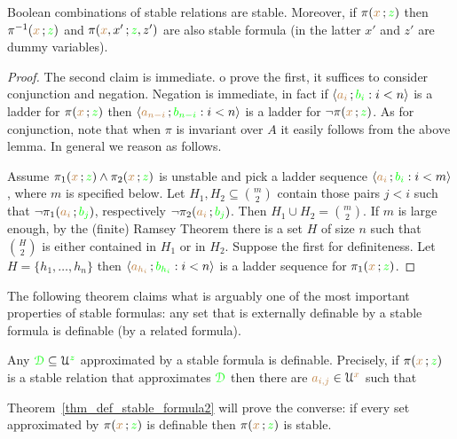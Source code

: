 \begin{lemma}\label{lem_stab_Boole}
  Boolean combinations of stable relations are stable.
  Moreover, if $\pi({\color{brown} x}\,;{\color{green} z})$ then  $\pi^{-1}({\color{brown} x}\,;{\color{green} z})$ and $\pi({\color{brown} x},x'\,;{\color{green} z},z')$ are also stable formula (in the latter $x'$ and $z'$ are dummy variables).
\end{lemma}

\begin{proof}
  The second claim is immediate.
  o prove the first, it suffices to consider conjunction and negation.
  Negation is immediate, in fact if $\langle{\color{brown}a_i}\,;{\color{green} b_i} : i<n\rangle$ is a ladder for $\pi({\color{brown} x}\,;{\color{green} z})$ then $\langle{\color{brown}a_{n-i}}\,;{\color{green} b_{n-i}} : i<n\rangle$ is a ladder for $\neg\pi({\color{brown} x}\,;{\color{green} z})$.
  As for conjunction, note that when $\pi$ is invariant over $A$ it easily follows from the above lemma.
  In general we reason as follows.

  Assume $\pi_1({\color{brown} x}\,;{\color{green} z})\wedge\pi_2({\color{brown} x}\,;{\color{green} z})$ is unstable and pick a ladder sequence $\langle{\color{brown}a_i}\,;{\color{green} b_i} : i<m\rangle$, where $m$ is specified below.
  Let $H_1,H_2\subseteq{m\choose 2}$ contain those pairs $j<i$ such that $\neg\pi_1({\color{brown} a_i}\,;{\color{green} b_j})$, respectively $\neg\pi_2({\color{brown} a_i}\,;{\color{green} b_j})$. 
  Then $H_1\cup H_2={m\choose 2}$. 
  If $m$ is large enough, by the (finite) Ramsey Theorem there is a set $H$ of size $n$ such that ${H\choose 2}$ is either contained in $H_1$ or in $H_2$. Suppose the first for definiteness. 
  Let $H=\{h_1,\dots,h_n\}$ then $\langle{\color{brown}a_{h_i}}\,;{\color{green} b_{h_i}} : i<n\rangle$ is a ladder sequence for $\pi_1({\color{brown} x}\,;{\color{green} z})$.
\end{proof}

The following theorem claims what is arguably one of the most important properties of stable formulas: any set that is externally definable by a stable formula is definable (by a related formula).

\begin{theorem}\label{thm_def_stable_formula}
Any ${\color{green}\EuScript D}\subseteq\EuScript U^{\color{green} z}$ approximated by a stable formula is definable.
Precisely, if $\pi({\color{brown} x}\,;{\color{green} z})$ is a stable relation that approximates ${\color{green}\EuScript D}$ then there are ${\color{brown} a_{i,j}}\in\EuScript U^{\color{brown} x}$ such that

\end{theorem}

Theorem~\ref{thm_def_stable_formula2} will prove the converse: if every set approximated by $\pi({\color{brown} x}\,;{\color{green} z})$ is definable then $\pi({\color{brown} x}\,;{\color{green} z})$ is stable.

